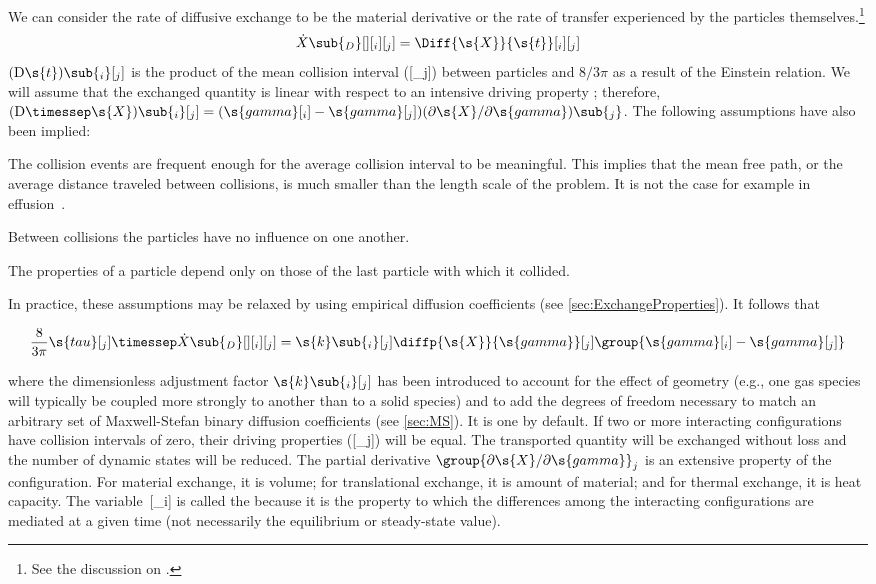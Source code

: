 We can consider the rate of diffusive exchange to be the material derivative or the rate of transfer experienced by the particles themselves.\footnote{See the discussion on \pageref{mark:TransportDiscussion}.}
\begin{equation}
  \label{eq:DiffusiveExchange1}
  \dot{X}\sub{_D}[ ][_i][_j] = \Diff{\s{X}}{\s{t}}[_i][_j]
\end{equation}
$(\mathrm{D}\s{t})\sub{_i}[_j]$ is the product of the mean collision interval ([_j]) between particles and $8/3\pi$ as a result of the Einstein relation.  We will assume that the exchanged quantity is linear with respect to an intensive driving property ; therefore, $(\mathrm{D}\timessep\s{X})\sub{_i}[_j] = (\s{gamma}[_i] - \s{gamma}[_j])(\partial\s{X}/\partial\s{gamma})\sub{_j}$.  The following assumptions have also been implied:
\begin{enumerate*}
  \item The collision events are frequent enough for the average collision interval to be meaningful.  This implies that the mean free path, or the average distance traveled between collisions, is much smaller than the length scale of the problem.  It is not the case for example in effusion~\cite{Present1958}.
  \item Between collisions the particles have no influence on one another.
  \item The properties of a particle depend only on those of the last particle with which it collided.
\end{enumerate*}
In practice, these assumptions may be relaxed by using empirical diffusion coefficients (see \autoref{sec:ExchangeProperties}).  It follows that

\begin{equation}
  \label{eq:DiffusiveExchange2}
  \frac{8}{3\pi}\s{tau}[_j]\timessep\dot{X}\sub{_D}[ ][_i][_j] = \s{k}\sub{_i}[_j]\diffp{\s{X}}{\s{gamma}}[_j]\group{\s{gamma}[_i] - \s{gamma}[_j]}
\end{equation}

where the dimensionless adjustment factor $\s{k}\sub{_i}[_j]$ has been introduced to account for the effect of geometry (e.g., one gas species will typically be coupled more strongly to another than to a solid species) and to add the degrees of freedom necessary to match an arbitrary set of Maxwell-Stefan binary diffusion coefficients (see \autoref{sec:MS}).  It is one by default.  If two or more interacting configurations have collision intervals of zero, their driving properties ([_j]) will be equal.  The transported quantity will be exchanged without loss and the number of dynamic states will be reduced.  The partial derivative $\group{\partial\s{X}/\partial\s{gamma}}_j$ is an extensive property of the configuration.  For material exchange, it is volume; for translational exchange, it is amount of material; and for thermal exchange, it is heat capacity.  The variable~[_i] is called the \emph{} because it is the property to which the differences among the interacting configurations are mediated at a given time (not necessarily the equilibrium or steady-state value).


